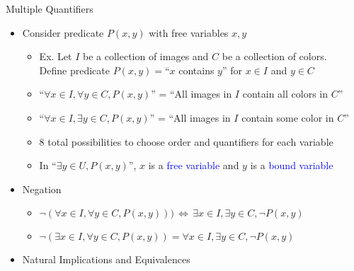 \documentclass[10pt,english]{beamer}
\begin{document}
\begin{frame}{Multiple Quantifiers}



\begin{itemize}
\setlength\itemsep{3mm}
\item<1-> Consider predicate $P(x,y)$ with free variables $x,y$ \vspace{1mm}
\begin{itemize}
 \setlength\itemsep{1.5mm}
 \item Ex. Let $I$ be a collection of images and $C$ be a collection of colors. \\ Define predicate $P(x,y)=$``$x$ contains $y$'' for $x\in I$ and $y\in C$ 
 \item ``$\forall x\!\in\! I, \forall y\!\in\! C, P(x,y)$'' = ``All images in $I$ contain all colors in $C$''
 \item ``$\forall x\!\in\! I, \exists y \!\in\! C, P(x,y)$'' = ``All images in $I$ contain some color in $C$''
 \item 8 total possibilities to choose order and quantifiers for each variable
 \item In ``$\exists y \in U, P(x,y)$'', $x$ is a \textcolor{blue}{free variable} and $y$ is a \textcolor{blue}{bound variable}
\end{itemize}

\item<2-> Negation \vspace{1mm}
\begin{itemize}
 \setlength\itemsep{1.5mm}
 \item $\neg (\forall x\!\in\! I, \forall y\!\in\! C, P(x,y))) \,\Leftrightarrow\, \exists x\!\in\! I, \exists y\!\in\! C, \neg P(x,y)$
 \item $\neg (\exists x\!\in\! I, \forall y\!\in\! C, P(x,y)) = \forall x\!\in\! I, \exists y\!\in\! C, \neg P(x,y)$
\end{itemize}  
\item<2-> Natural Implications and Equivalences \vspace{1mm}


\end{itemize}
\end{frame}
\end{document}
